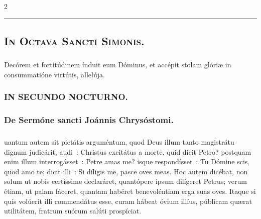 \documentclass[9pt,twoside]{extarticle}
\begin{document}
\begin{multicols}{2}
\begin{center}\textcolor{red}{\rule{\linewidth}{0.5pt}} \end{center}

\subsubsection*{\center {}}
\subsection*{\center \textsc{In Octava Sancti Simonis.}}
\subsubsection*{\center {}}
\begin{tightlist}{}
\item {}
\item {} Decórem et fortitúdinem índuit eum Dóminus, et accépit stolam glóriæ in consummatióne virtútis, allelúja. 
\item {}
\item {}
\end{tightlist}

\subsubsection*{\center \textsc{IN SECUNDO NOCTURNO.}}
\subsubsection*{\center De Sermóne sancti Joánnis Chrysóstomi.}
\subsubsection*{\center {}}
uantum autem sit pietátis arguméntum, quod Deus illum tanto magistrátu dignum judicárit, audi~: Christus excitátus a morte, quid dicit Petro? postquam enim illum interrogásset~: Petre amas me? isque respondísset~: Tu Dómine scis, quod amo te; dicit illi~: Si díligis me, pasce oves meas. Hoc autem dicébat, non solum ut nobis certíssime declaráret, quantópere ipsum dilígeret Petrus; verum étiam, ut palam fáceret, quantam habéret benevoléntiam erga suas oves. Itaque si quis volúerit illi commendátus esse, curam hábeat óvium illíus, públicam quærat utilitátem, fratrum suórum salúti prospíciat.


\end{multicols}
\end{document}
